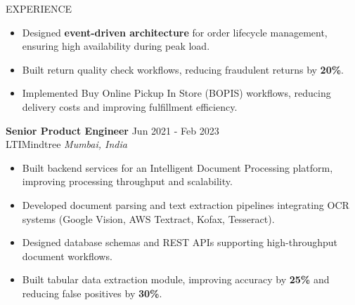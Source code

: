 \documentclass{resume}
\begin{document}
\begin{rSection}{EXPERIENCE}
\begin{itemize}
\item Designed \textbf{event-driven architecture} for order lifecycle management, ensuring high availability during peak load.

\item Built return quality check workflows, reducing fraudulent returns by \textbf{20\%}.

\item Implemented Buy Online Pickup In Store (BOPIS) workflows, reducing delivery costs and improving fulfillment efficiency.

\end{itemize}


\textbf{Senior Product Engineer} \hfill Jun 2021 - Feb 2023\\
LTIMindtree \hfill \textit{Mumbai, India}
\begin{itemize}

\item Built backend services for an Intelligent Document Processing platform, improving processing throughput and scalability.

\item Developed document parsing and text extraction pipelines integrating OCR systems (Google Vision, AWS Textract, Kofax, Tesseract).

\item Designed database schemas and REST APIs supporting high-throughput document workflows.

\item Built tabular data extraction module, improving accuracy by \textbf{25\%} and reducing false positives by \textbf{30\%}.

\end{itemize}

\end{rSection}
\end{document}

